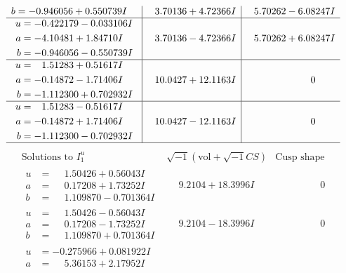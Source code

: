 \documentclass[1p]{elsarticle_modified}
\theoremstyle{definition}
\newcommand{\I}{\sqrt{-1}}
\begin{document}
$$\begin{array}{c|c|c}
\begin{aligned}
b &= -0.946056 + 0.550739 I\end{aligned}
 & \phantom{-}3.70136 + 4.72366 I & \phantom{-}5.70262 - 6.08247 I \\ \hline\begin{aligned}
u &= -0.422179 - 0.033106 I \\
a &= -4.10481 + 1.84710 I \\
b &= -0.946056 - 0.550739 I\end{aligned}
 & \phantom{-}3.70136 - 4.72366 I & \phantom{-}5.70262 + 6.08247 I \\ \hline\begin{aligned}
u &= \phantom{-}1.51283 + 0.51617 I \\
a &= -0.14872 - 1.71406 I \\
b &= -1.112300 + 0.702932 I\end{aligned}
 & \phantom{-}10.0427 + 12.1163 I & \phantom{-0.000000 } 0 \\ \hline\begin{aligned}
u &= \phantom{-}1.51283 - 0.51617 I \\
a &= -0.14872 + 1.71406 I \\
b &= -1.112300 - 0.702932 I\end{aligned}
 & \phantom{-}10.0427 - 12.1163 I & \phantom{-0.000000 } 0\\
 \hline 
 \end{array}$$\newpage$$\begin{array}{c|c|c}  
\text{Solutions to }I^u_{1}& \I (\text{vol} + \sqrt{-1}CS) & \text{Cusp shape}\\
 \hline 
\begin{aligned}
u &= \phantom{-}1.50426 + 0.56043 I \\
a &= \phantom{-}0.17208 + 1.73252 I \\
b &= \phantom{-}1.109870 - 0.701364 I\end{aligned}
 & \phantom{-}9.2104 + 18.3996 I & \phantom{-0.000000 } 0 \\ \hline\begin{aligned}
u &= \phantom{-}1.50426 - 0.56043 I \\
a &= \phantom{-}0.17208 - 1.73252 I \\
b &= \phantom{-}1.109870 + 0.701364 I\end{aligned}
 & \phantom{-}9.2104 - 18.3996 I & \phantom{-0.000000 } 0 \\ \hline\begin{aligned}
u &= -0.275966 + 0.081922 I \\
a &= \phantom{-}5.36153 + 2.17952 I \\

\end{aligned}
\end{array}$$
\end{document}
